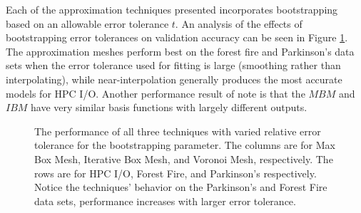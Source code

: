 Each of the approximation techniques presented incorporates bootstrapping based on an allowable error tolerance $t$. An analysis of the effects of bootstrapping error tolerances on validation accuracy can be seen in Figure \ref{fig_all_performance}. The approximation meshes perform best on the forest fire and Parkinson's data sets when the error tolerance used for fitting is large (smoothing rather than interpolating), while near-interpolation generally produces the most accurate models for HPC I/O. Another performance result of note is that the $MBM$ and $IBM$ have very similar basis functions with largely different outputs.

\begin{figure}
  \caption{The performance of all three techniques with varied relative error tolerance for the bootstrapping parameter. The columns are for Max Box Mesh, Iterative Box Mesh, and Voronoi Mesh, respectively. The rows are for HPC I/O, Forest Fire, and Parkinson's respectively. Notice the techniques' behavior on the Parkinson's and Forest Fire data sets, performance increases with larger error tolerance.}
  \label{fig_all_performance}
\end{figure}


